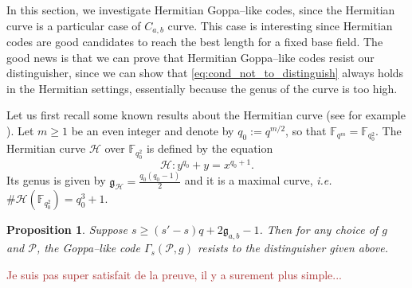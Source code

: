 \documentclass[a4paper]{article}
\newtheorem{proposition}[thm]{Proposition}
\theoremstyle{definition}
\theoremstyle{remark}
\newcommand{\calP}{\mathcal{P}}
\newcommand{\calH}{\mathcal{H}}
\newcommand{\fqm}{\mathbb{F}_{q^m}}
\newcommand{\fqo}{\mathbb{F}_{q_0^2}}
\newcommand\mathieu[1]{\textcolor{brown}{#1}}
\begin{document}
In this section, we investigate Hermitian Goppa--like codes, since the Hermitian curve is a particular case of $C_{a,b}$ curve. This case is interesting since Hermitian codes are good candidates to reach the best length for a fixed base field. The good news is that we can prove that Hermitian Goppa--like codes resist our distinguisher, since we can show that \eqref{eq:cond_not_to_distinguish} always holds in the Hermitian settings, essentially because  the genus of the curve is too high. 

\noindent Let us first recall some known results about the Hermitian curve (see for example \cite{Sti09}). Let $m \geq 1$  be an even integer and denote by $q_0 := q^{m/2}$, so that $\fqm = \fqo$. The Hermitian curve $\calH$ over $\fqo$ is defined by the equation
$$\calH : y^{q_0}+y = x^{q_0+1}.$$
Its genus is given by $\mathfrak{g}_{\calH} = \frac{q_0(q_0-1)}{2}$ and it is a maximal curve, \emph{i.e.} $\#\calH(\fqo) = q_0^3+1$.


\begin{proposition} \label{prop:Hermitian_Goppa_like_are_secured}
    Suppose $s \geq (s'-s)q+2\mathfrak{g}_{a,b}-1$. Then for any choice of $g$ and $\calP$, the Goppa--like code $\Gamma_s(\calP,g)$ resists to the distinguisher given above.
\end{proposition}

\mathieu{Je suis pas super satisfait de la preuve, il y a surement plus simple...}
\end{document}
